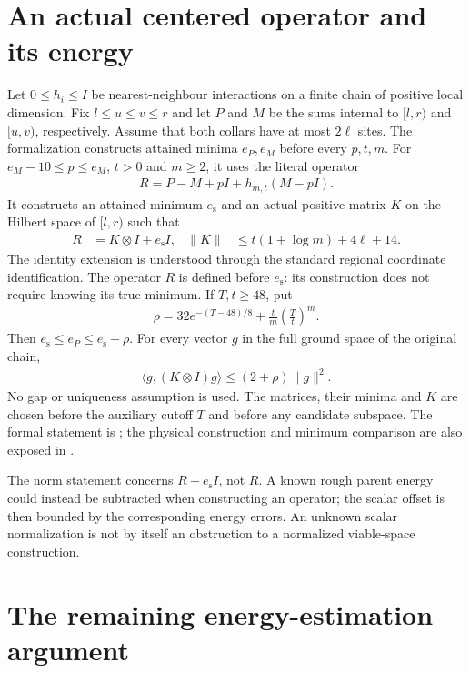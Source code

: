 \documentclass{article}
\begin{document}
\section{An actual centered operator and its energy}

Let $0\le h_i\le I$ be nearest-neighbour interactions on a finite chain
of positive local dimension. Fix $l\le u\le v\le r$ and let $P$ and $M$
be the sums internal to $[l,r)$ and $[u,v)$, respectively. Assume that
both collars have at most $2\ell$ sites. The formalization constructs
attained minima $e_P,e_M$ before every $p,t,m$. For
$e_M-10\le p\le e_M$, $t>0$ and $m\ge2$, it uses the literal operator
\begin{align}
 R=P-M+pI+h_{m,t}(M-pI).
\end{align}
It constructs an attained minimum $e_{\mathrm s}$ and an actual positive
matrix $K$ on the Hilbert space of $[l,r)$ such that
\begin{align}
 R&=K\otimes I+e_{\mathrm s}I,&
 \|K\|&\le t(1+\log m)+4\ell+14.
\end{align}
The identity extension is understood through the standard regional
coordinate identification. The operator $R$ is defined before
$e_{\mathrm s}$: its construction does not require knowing its true
minimum. If $T,t\ge48$, put
\begin{align}
 \rho=32e^{-(T-48)/8}+\frac{t}{m}\left(\frac{T}{t}\right)^m.
\end{align}
Then $e_{\mathrm s}\le e_P\le e_{\mathrm s}+\rho$. For every vector $g$
in the full ground space of the original chain,
\begin{align}
 \langle g,(K\otimes I)g\rangle\le(2+\rho)\|g\|^2.
\end{align}
No gap or uniqueness assumption is used. The matrices, their minima and
$K$ are chosen before the auxiliary cutoff $T$ and before any candidate
subspace. The formal statement is
;
the physical construction and minimum comparison are also exposed in
.

The norm statement concerns $R-e_{\mathrm s}I$, not $R$. A known rough
parent energy could instead be subtracted when constructing an operator;
the scalar offset is then bounded by the corresponding energy errors.
An unknown scalar normalization is not by itself an obstruction to a
normalized viable-space construction.

\section{The remaining energy-estimation argument}
\end{document}
